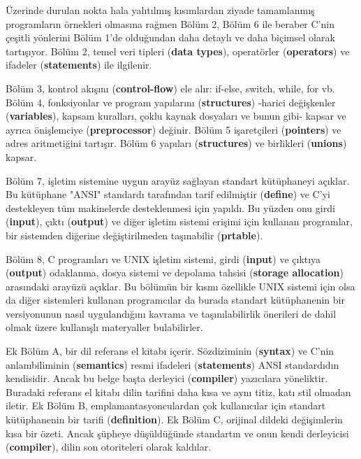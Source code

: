 \documentclass[a4paper,12pt,oneside]{book}
\begin{document}
\par Üzerinde durulan nokta hala yalıtılmış kısımlardan ziyade tamamlanmış programların örnekleri olmasına rağmen Bölüm 2, Bölüm 6 ile beraber C'nin çeşitli yönlerini Bölüm 1'de olduğundan daha detaylı ve daha biçimsel olarak tartışıyor. Bölüm 2, temel veri tipleri (\textbf{data types}), operatörler (\textbf{operators}) ve ifadeler (\textbf{statements}) ile ilgilenir. \pagebreak

\noindent \thispagestyle{introduction} Bölüm 3, kontrol akışını (\textbf{control-flow}) ele alır: if-else, switch, while, for vb. Bölüm 4, fonksiyonlar  ve program yapılarını (\textbf{structures}) -harici değişkenler (\textbf{variables}), kapsam kuralları, çoklu kaynak dosyaları ve bunun gibi- kapsar ve ayrıca önişlemciye (\textbf{preprocessor}) değinir. Bölüm 5 işaretçileri (\textbf{pointers}) ve adres aritmetiğini tartışır. Bölüm 6 yapıları (\textbf{structures}) ve birlikleri (\textbf{unions}) kapsar.
\par Bölüm 7, işletim sistemine uygun arayüz sağlayan standart kütüphaneyi açıklar. Bu kütüphane "ANSI" standardı tarafından tarif edilmiştir (\textbf{define}) ve C'yi destekleyen tüm makinelerde desteklenmesi için yapıldı. Bu yüzden onu girdi (\textbf{input}), çıktı (\textbf{output}) ve diğer işletim sistemi erişimi için kullanan programlar, bir sistemden diğerine değiştirilmeden taşınabilir (\textbf{prtable}).
\par Bölüm 8, C programları ve UNIX işletim sistemi, girdi (\textbf{input}) ve çıktıya (\textbf{output}) odaklanma, dosya sistemi ve depolama tahsisi (\textbf{storage allocation}) arasındaki arayüzü açıklar. Bu bölümün bir kısmı özellikle UNIX sistemi için olsa da diğer sistemleri kullanan programcılar da burada standart kütüphanenin bir versiyonunun nasıl uygulandığını kavrama ve taşınılabilirlik önerileri de dahil olmak üzere kullanışlı materyaller bulabilirler.
\par Ek Bölüm A, bir dil referans el kitabı içerir. Sözdiziminin (\textbf{syntax}) ve C'nin anlambiliminin (\textbf{semantics}) resmi ifadeleri (\textbf{statements}) ANSI standardıdın kendisidir. Ancak bu belge başta derleyici (\textbf{compiler}) yazıcılara yöneliktir. Buradaki referans el kitabı dilin tarifini daha kısa ve aynı titiz, katı stil olmadan iletir. Ek Bölüm B, emplamantasyonculardan çok kullanıcılar için standart kütüphanenin bir tarifi (\textbf{definition}). Ek Bölüm C, orijinal dildeki değişimlerin kısa bir özeti. Ancak şüpheye düşüldüğünde standartın ve onun kendi derleyicisi (\textbf{compiler}), dilin son otoriteleri olarak kaldılar.
\end{document}
